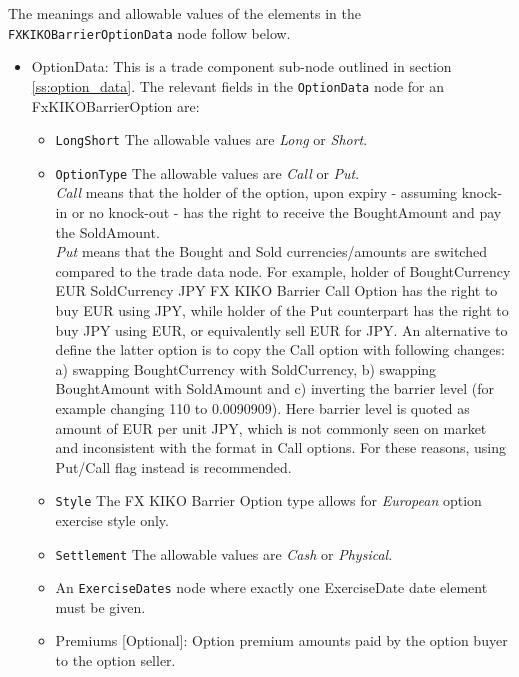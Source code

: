 The meanings and allowable values of the elements in the \lstinline!FXKIKOBarrierOptionData!  node follow below.

\begin{itemize}

\item OptionData: This is a trade component sub-node outlined in section \ref{ss:option_data}. 
The relevant fields in the \lstinline!OptionData! node for an FxKIKOBarrierOption are:

\begin{itemize}
\item \lstinline!LongShort! The allowable values are \emph{Long} or \emph{Short}.

\item \lstinline!OptionType! The allowable values are \emph{Call} or \emph{Put}. \\
 \emph{Call} means that the holder of the option, upon expiry - assuming knock-in or no knock-out - has the right to receive the BoughtAmount and pay the SoldAmount. \\\emph{Put} means that the Bought and Sold currencies/amounts are switched compared to the trade data node. 
For example, holder of BoughtCurrency EUR SoldCurrency JPY FX KIKO Barrier Call Option has the right to buy EUR using JPY, while
holder of the Put counterpart has the right to buy JPY using EUR, or equivalently sell EUR for JPY. An alternative to define the latter option is to copy the Call option with following changes:\\
a) swapping BoughtCurrency with SoldCurrency, b) swapping BoughtAmount with SoldAmount and c) inverting the barrier level (for example changing 110 to 0.0090909). Here barrier level is
quoted as amount of EUR per unit JPY, which is not commonly seen on market and inconsistent with the format in Call options. For these reasons, using Put/Call flag instead is recommended.

\item  \lstinline!Style! The FX KIKO Barrier Option type allows for \emph{European} option exercise style only.

\item  \lstinline!Settlement! The allowable values are \emph{Cash} or \emph{Physical}.

\item An \lstinline!ExerciseDates! node where exactly one ExerciseDate date element must be given.

\item Premiums [Optional]: Option premium amounts paid by the option buyer to the option seller.


\end{itemize}
\end{itemize}
